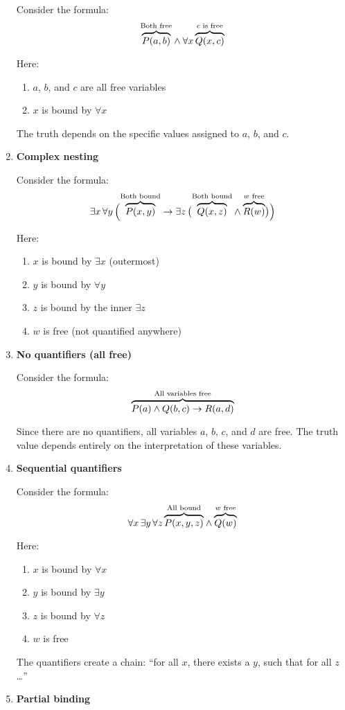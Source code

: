 \documentclass[12pt,a4paper,openany]{article}
\begin{document}
\begin{enumerate}
    Consider the formula:
    \[
    {\color{black}\overbrace{\color{black}P(a, b)}^{\color{black}\text{Both free}}} \wedge
    \forall x \,
    {\color{black}\overbrace{\color{black}Q(x, c)}^{\color{black}c \text{ is free}}}
    \]

    Here:
    \begin{enumerate}
        \item $a$, $b$, and $c$ are all free variables
        \item $x$ is bound by $\forall x$
    \end{enumerate}
    The truth depends on the specific values assigned to $a$, $b$, and $c$.
\item
    \textbf{Complex nesting}

    Consider the formula:
    \[
    \exists x \, \forall y \, \Big(
    {\color{black}\overbrace{\color{black}P(x, y)}^{\color{black}\text{Both bound}}} \to
    \exists z \,
    \big(
    {\color{black}\overbrace{\color{black}Q(x, z)}^{\color{black}\text{Both bound}}} \wedge
    {\color{black}\overbrace{\color{black}R(w)}^{\color{black}w \text{ free}}}
    \big)
    \Big)
    \]

    Here:
    \begin{enumerate}
        \item $x$ is bound by $\exists x$ (outermost)
        \item $y$ is bound by $\forall y$
        \item $z$ is bound by the inner $\exists z$
        \item $w$ is free (not quantified anywhere)
    \end{enumerate}
\item
    \textbf{No quantifiers (all free)}

    Consider the formula:
    \[
    {\color{black}\overbrace{\color{black}P(a) \wedge Q(b, c) \to R(a, d)}^{\color{black}\text{All variables free}}}
    \]

    Since there are no quantifiers, all variables $a$, $b$, $c$, and $d$ are free. The truth value depends entirely on the interpretation of these variables.
\item
    \textbf{Sequential quantifiers}

    Consider the formula:
    \[
    \forall x \, \exists y \, \forall z \,
    {\color{black}\overbrace{\color{black}P(x, y, z)}^{\color{black}\text{All bound}}} \wedge
    {\color{black}\overbrace{\color{black}Q(w)}^{\color{black}w \text{ free}}}
    \]

    Here:
    \begin{enumerate}
        \item $x$ is bound by $\forall x$
        \item $y$ is bound by $\exists y$
        \item $z$ is bound by $\forall z$
        \item $w$ is free
    \end{enumerate}
    The quantifiers create a chain: ``for all $x$, there exists a $y$, such that for all $z$\ldots''
\item
    \textbf{Partial binding}


\end{enumerate}
\end{document}
